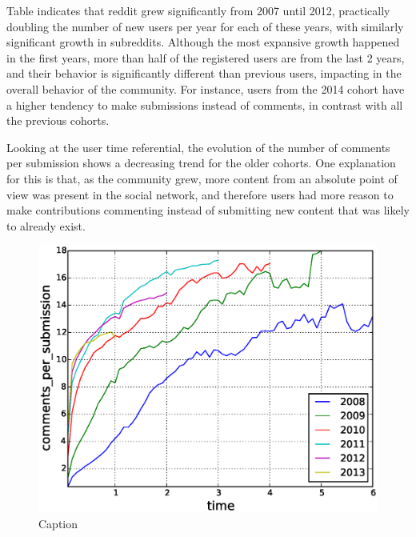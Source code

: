Table indicates that reddit grew significantly from 2007 until 2012, practically doubling the number of new users per year for each of these years, with similarly significant growth in subreddits. Although the most expansive growth happened in the first years, more than half of the registered users are from the last 2 years, and their behavior is significantly different than previous users, impacting in the overall behavior of the community. For instance, users from the 2014 cohort have a higher tendency to make submissions instead of comments, in contrast with all the previous cohorts.

Looking at the user time referential, the evolution of the number of comments per submission shows a decreasing trend for the older cohorts. One explanation for this is that, as the community grew, more content from an absolute point of view was present in the social network, and therefore users had more reason to make contributions commenting instead of submitting new content that was likely to already exist.

\begin{figure}[!tb]
\centering
\includegraphics[scale=0.4]{./images/comments_per_submissions_cohorts.eps}
\caption{Caption}
\label{fig:comments_per_submissions_cohorts}
\end{figure}

